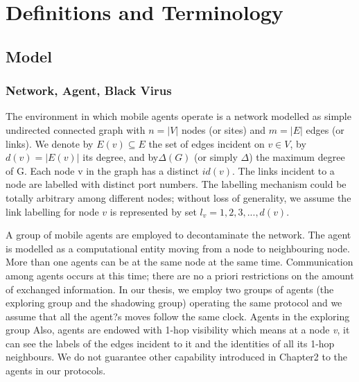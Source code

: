 \chapter {Definitions and Terminology}
\label{PM}
\section{Model}
\subsection{Network, Agent, Black Virus}

 The environment in which mobile agents operate is a network modelled as simple undirected connected graph with $n = \left |V\right |$ nodes (or sites) and $m = \left |E\right |$ edges (or links). We denote by $E (v)\subseteq E$ the set of edges incident on $v\in V$, by $d (v) = \left|E (v)\right|$ its degree, and by$\Delta(G)$ (or simply $\Delta$) the maximum degree of G. Each node v in the graph has a distinct $id(v)$. The links incident to a node are labelled with distinct port numbers. The labelling mechanism could be totally arbitrary among different nodes; without loss of generality, we assume the link labelling for node $v$ is represented by set $l_v =1,2,3,...,d(v)$.

 A group of mobile agents are employed to decontaminate the network. The agent is modelled as a computational entity moving from a node to neighbouring node. More than one agents can be at the same node at the same time. Communication among agents occurs at this time; there are no a priori restrictions on the amount of exchanged information. In our thesis, we employ two groups of agents (the exploring group and the shadowing group) operating the same protocol and we assume that all the agent?s moves follow the same clock. Agents in the exploring group Also, agents are endowed with 1-hop visibility which means at a node {\em v}, it can see the labels of the edges incident to it and the identities of all its 1-hop neighbours. We do not guarantee other capability introduced in Chapter2 to the agents in our protocols.


